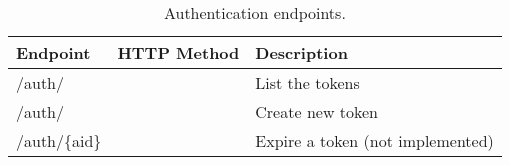 \begin{table}[htpb]
    \centering
    \begin{tabu} to \textwidth {lX[c]l}
        Endpoint                         & HTTP Method & Description                         \\
        \midrule
        /auth/                &          & List the tokens                          \\
        /auth/                &         & Create new token                         \\
        /auth/\{aid\}         &       & Expire a token (not implemented)         \\
    \end{tabu}
    \caption{Authentication endpoints.}\label{tab:rest_auth}
\end{table}
